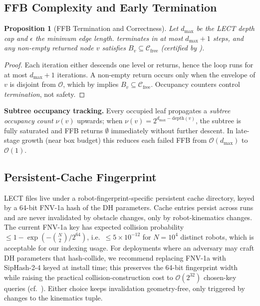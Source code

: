 \documentclass[journal]{IEEEtran}
\newtheorem{proposition}{Proposition}
\newcommand{\Cfree}{\mathcal{C}_{\mathrm{free}}}
\newcommand{\calO}{\mathcal{O}}
\begin{document}
\subsection{FFB Complexity and Early Termination}\label{sec:ffb_analysis}

\begin{proposition}[FFB Termination and Correctness]\label{prop:ffb}
Let $d_{\max}$ be the LECT depth cap and $\epsilon$ the minimum edge
length.  terminates in at most $d_{\max}+1$ steps, and
any non-empty returned node $v$ satisfies $B_v\subseteq\Cfree$ (certified
by ).
\end{proposition}

\begin{proof}
Each iteration either descends one level or returns, hence the loop
runs for at most $d_{\max}+1$ iterations. A non-empty return occurs
only when the envelope of $v$ is disjoint from $\calO$, which by
 implies $B_v\subseteq\Cfree$. Occupancy counters
control \emph{termination}, not safety.
\end{proof}

\textbf{Subtree occupancy tracking.}
Every occupied leaf propagates a \emph{subtree occupancy count}
$\nu(v)$ upwards; when $\nu(v) = 2^{d_{\max}-\mathrm{depth}(v)}$, the
subtree is fully saturated and FFB returns $\emptyset$ immediately
without further descent. In late-stage growth (near box budget) this
reduces each failed FFB from $\mathcal{O}(d_{\max})$ to $\mathcal{O}(1)$.

\subsection{Persistent-Cache Fingerprint}

LECT files live under a robot-fingerprint-specific persistent cache
directory, keyed by a 64-bit FNV-1a hash of the DH parameters. Cache
entries persist across runs and are never invalidated by obstacle
changes, only by robot-kinematics changes.
The current FNV-1a key has expected collision probability
$\le 1\!-\!\exp(-\binom{N}{2}/2^{64})$, i.e.\ $\le 5{\times}10^{-12}$
for $N\!=\!10^4$ distinct robots, which is acceptable for our
indexing usage. For deployments where an adversary may craft DH
parameters that hash-collide, we recommend replacing FNV-1a with
SipHash-2-4 keyed at install time; this preserves the 64-bit fingerprint
width while raising the practical collision-construction cost to
$\mathcal{O}(2^{32})$ chosen-key queries (cf.\
\cite{aumasson2012siphash}). Either choice keeps invalidation
geometry-free, only triggered by changes to the kinematics tuple.
\end{document}
